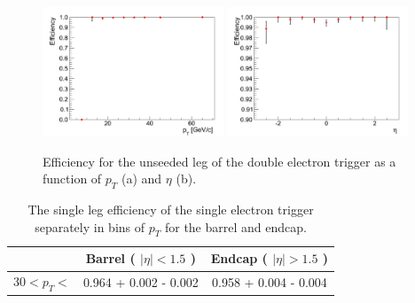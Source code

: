 \begin{figure}[!ht]
\begin{center}
\includegraphics[width=0.48\textwidth]{figures/ElectronTriggerEffVsPt_Ele17Ele8.pdf}
\includegraphics[width=0.48\textwidth]{figures/ElectronTriggerEffVsEta_Ele17Ele8.pdf}
\end{center}
\caption{Efficiency for the unseeded leg of the double electron trigger as a function of $p_{T}$ (a) and $\eta$ (b).}
\label{fig:Ele17Ele8TriggerEfficiencyUnseededLeg}
\end{figure}



\begin{table}[!ht]
\begin{center}
\begin{tabular}{|c|c|c|} \hline
              & Barrel ( $|\eta|<1.5$ )  & Endcap ( $|\eta|>1.5$ )  \\ 
\hline
30$<p_{T}<$   & 0.964 + 0.002 - 0.002 & 0.958 + 0.004 - 0.004 \\
\hline
\end{tabular}
\caption{The single leg efficiency of the single electron trigger 
separately in bins of $p_{T}$ for the barrel and endcap.
\label{tab:Ele27Efficiency}}
\end{center}
\end{table}


